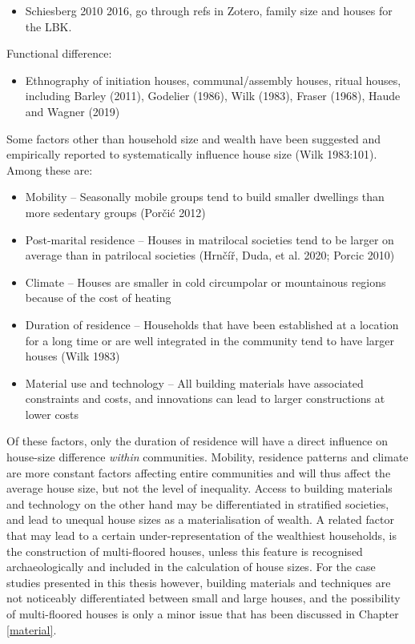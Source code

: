 \documentclass[
  12pt,
]{book}
\providecommand{\tightlist}{%
  \setlength{\itemsep}{0pt}\setlength{\parskip}{0pt}}
\begin{document}
\begin{itemize}
\tightlist
\item
  Schiesberg 2010 2016, go through refs in Zotero, family size and houses for the LBK.
\end{itemize}

Functional difference:

\begin{itemize}
\tightlist
\item
  Ethnography of initiation houses, communal/assembly houses, ritual houses, including Barley (2011), Godelier (1986), Wilk (1983), Fraser (1968), Haude and Wagner (2019)
\end{itemize}

Some factors other than household size and wealth have been suggested and empirically reported to systematically influence house size (Wilk 1983:101). Among these are:

\begin{itemize}
\item
  Mobility -- Seasonally mobile groups tend to build smaller dwellings than more sedentary groups (Porčić 2012)
\item
  Post-marital residence -- Houses in matrilocal societies tend to be larger on average than in patrilocal societies (Hrnčíř, Duda, et al. 2020; Porcic 2010)
\item
  Climate -- Houses are smaller in cold circumpolar or mountainous regions because of the cost of heating
\item
  Duration of residence -- Households that have been established at a location for a long time or are well integrated in the community tend to have larger houses (Wilk 1983)
\item
  Material use and technology -- All building materials have associated constraints and costs, and innovations can lead to larger constructions at lower costs
\end{itemize}

Of these factors, only the duration of residence will have a direct influence on house-size difference \emph{within} communities. Mobility, residence patterns and climate are more constant factors affecting entire communities and will thus affect the average house size, but not the level of inequality. Access to building materials and technology on the other hand may be differentiated in stratified societies, and lead to unequal house sizes as a materialisation of wealth. A related factor that may lead to a certain under-representation of the wealthiest households, is the construction of multi-floored houses, unless this feature is recognised archaeologically and included in the calculation of house sizes. For the case studies presented in this thesis however, building materials and techniques are not noticeably differentiated between small and large houses, and the possibility of multi-floored houses is only a minor issue that has been discussed in Chapter \ref{material}.
\end{document}
